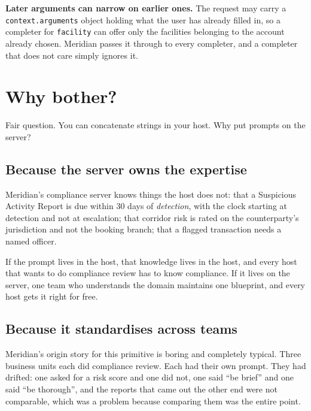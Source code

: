 \textbf{Later arguments can narrow on earlier ones.} The request may carry a
\texttt{context.arguments} object holding what the user has already filled in,
so a completer for \texttt{facility} can offer only the facilities belonging to
the account already chosen. Meridian passes it through to every completer, and
a completer that does not care simply ignores it.

\section{Why bother?}

Fair question. You can concatenate strings in your host. Why put prompts on the
server?

\subsection{Because the server owns the expertise}

Meridian's compliance server knows things the host does not: that a Suspicious Activity Report is due within 30 days of \emph{detection},
with the clock starting at detection and not at escalation; that corridor risk
is rated on the counterparty's jurisdiction and not the booking branch; that a flagged transaction needs a named officer.

If the prompt lives in the host, that knowledge lives in the host, and every host
that wants to do compliance review has to know compliance. If it lives on the
server, one team who understands the domain maintains one blueprint, and every
host gets it right for free.


\subsection{Because it standardises across teams}

Meridian's origin story for this primitive is boring and completely typical.
Three business units each did compliance review. Each had their own prompt.
They had drifted: one asked for a risk score and one did not, one said ``be
brief'' and one said ``be thorough'', and the reports that came out the other
end were not comparable, which was a problem because comparing them was the
entire point.

